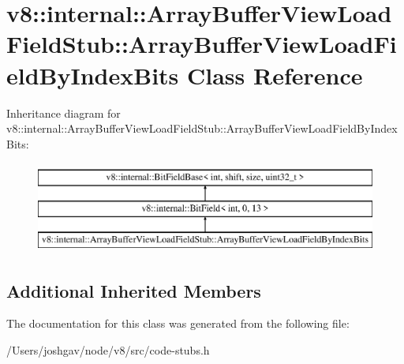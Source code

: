 \hypertarget{classv8_1_1internal_1_1_array_buffer_view_load_field_stub_1_1_array_buffer_view_load_field_by_index_bits}{}\section{v8\+:\+:internal\+:\+:Array\+Buffer\+View\+Load\+Field\+Stub\+:\+:Array\+Buffer\+View\+Load\+Field\+By\+Index\+Bits Class Reference}
\label{classv8_1_1internal_1_1_array_buffer_view_load_field_stub_1_1_array_buffer_view_load_field_by_index_bits}
Inheritance diagram for v8\+:\+:internal\+:\+:Array\+Buffer\+View\+Load\+Field\+Stub\+:\+:Array\+Buffer\+View\+Load\+Field\+By\+Index\+Bits\+:\begin{figure}[H]
\begin{center}
\leavevmode
\includegraphics[height=3.000000cm]{classv8_1_1internal_1_1_array_buffer_view_load_field_stub_1_1_array_buffer_view_load_field_by_index_bits}
\end{center}
\end{figure}
\subsection*{Additional Inherited Members}


The documentation for this class was generated from the following file\+:\begin{DoxyCompactItemize}
\item 
/\+Users/joshgav/node/v8/src/code-\/stubs.\+h\end{DoxyCompactItemize}
